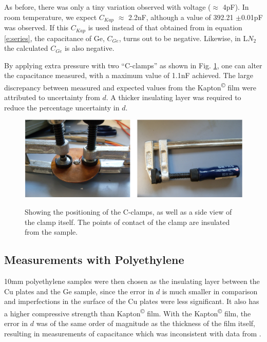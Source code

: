 \documentclass[a4paper,11pt]{article}
\begin{document}
As before, there was only a tiny variation observed with voltage ($\approx$ 4pF). In room temperature, we expect $C_{Kap}$ $\approx$ 2.2nF, although a value of 392.21 $\pm$0.01pF was observed. If this $C_{Kap}$ is used instead of that obtained from \cite{DuPont} in equation \ref{e:series}, the capacitance of Ge, $C_{Ge}$, turns out to be negative. Likewise, in L$N_{2}$ the calculated $C_{Ge}$ is also negative.

By applying extra pressure with two ``C-clamps'' as shown in Fig. \ref{f:clamps}, one can alter the capacitance measured, with a maximum value of 1.1nF achieved. The large discrepancy between measured and expected values from the Kapton\textsuperscript{\copyright} film were attributed to uncertainty from $d$. A thicker insulating layer was required to reduce the percentage uncertainty in $d$. 

\begin{figure}[htpb]
\centering
\includegraphics[scale=0.4]{clamps}
	\label{f:clamps}
	\caption{Showing the positioning of the C-clamps, as well as a side view of the clamp itself. The points of contact of the clamp are insulated from the sample.}
\end{figure}

\subsection{Measurements with Polyethylene}
\label{ss:PEonly}

10mm polyethylene samples were then chosen as the insulating layer between the Cu plates and the Ge sample, since the error in $d$ is much smaller in comparison and imperfections in the surface of the Cu plates were less significant. It also has a higher compressive strength than Kapton\textsuperscript{\copyright} film. With the Kapton\textsuperscript{\copyright} film, the error in $d$ was of the same order of magnitude as the thickness of the film itself, resulting in measurements of capacitance which was inconsistent with data from \cite{DuPont}.\\
\end{document}
